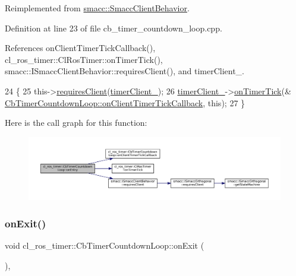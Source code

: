 Reimplemented from \hyperlink{classsmacc_1_1SmaccClientBehavior_ad5d3e1f1697c3cfe66c94cadba948493}{smacc\+::\+Smacc\+Client\+Behavior}.



Definition at line 23 of file cb\+\_\+timer\+\_\+countdown\+\_\+loop.\+cpp.



References on\+Client\+Timer\+Tick\+Callback(), cl\+\_\+ros\+\_\+timer\+::\+Cl\+Ros\+Timer\+::on\+Timer\+Tick(), smacc\+::\+I\+Smacc\+Client\+Behavior\+::requires\+Client(), and timer\+Client\+\_\+.


\begin{DoxyCode}
24 \{
25     this->\hyperlink{classsmacc_1_1ISmaccClientBehavior_a32b16e99e3b4cb289414203dc861a440}{requiresClient}(\hyperlink{classcl__ros__timer_1_1CbTimerCountdownLoop_acca81b8f1807f8e8faf692fb3f9e4dbd}{timerClient\_});
26     \hyperlink{classcl__ros__timer_1_1CbTimerCountdownLoop_acca81b8f1807f8e8faf692fb3f9e4dbd}{timerClient\_}->\hyperlink{classcl__ros__timer_1_1ClRosTimer_a7edcc057bfb5a25fe0892755137dd8da}{onTimerTick}(&
      \hyperlink{classcl__ros__timer_1_1CbTimerCountdownLoop_acb16f3448ad5955bf36e7c2cfd9f691c}{CbTimerCountdownLoop::onClientTimerTickCallback}, \textcolor{keyword}{this});
27 \}
\end{DoxyCode}
Here is the call graph for this function\+:
\nopagebreak
\begin{figure}[H]
\begin{center}
\leavevmode
\includegraphics[width=350pt]{classcl__ros__timer_1_1CbTimerCountdownLoop_aa088f15db4fb2c307c86b30b2e1f7744_cgraph}
\end{center}
\end{figure}
\mbox{\label{classcl__ros__timer_1_1CbTimerCountdownLoop_a5623e9fdd8f0fb23e8707f7816c099d6}} 
\subsubsection{\texorpdfstring{on\+Exit()}{onExit()}}
{\footnotesize\ttfamily void cl\+\_\+ros\+\_\+timer\+::\+Cb\+Timer\+Countdown\+Loop\+::on\+Exit (\begin{DoxyParamCaption}{ }\end{DoxyParamCaption})\hspace{0.3cm}{\ttfamily [override]}, {\ttfamily [virtual]}}



